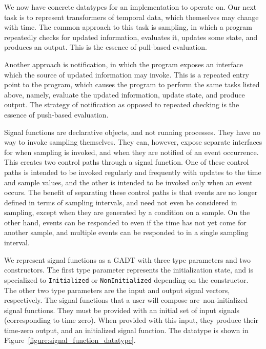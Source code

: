 \documentclass[draft]{llncs}
\begin{document}
We now have concrete datatypes for an implementation to operate on. Our next
task is to represent transformers of temporal data, which themselves may change
with time. The common approach to this task is sampling, in which a program
repeatedly checks for updated information, evaluates it, updates some state,
and produces an output. This is the essence of pull-based evaluation.

Another approach is notification, in which the program exposes an interface
which the source of updated information may invoke. This is a repeated entry
point to the program, which causes the program to perform the same tasks
listed above, namely, evaluate the updated information, update state, and
produce output. The strategy of notification as opposed to repeated checking is
the essence of push-based evaluation.

Signal functions are declarative objects, and not running processes. They have
no way to invoke sampling themselves. They can, however, expose separate
interfaces for when sampling is invoked, and when they are notified of an event
occurrence. This creates two control paths through a signal function. One of
these control paths is intended to be invoked regularly and frequently with
updates to the time and sample values, and the other is intended to be invoked
only when an event occurs. The benefit of separating these control paths is that
events are no longer defined in terms of sampling intervals, and need not even
be considered in sampling, except when they are generated by a condition on a
sample. On the other hand, events can be responded to even if the time has not
yet come for another sample, and multiple events can be responded to in a single
sampling interval.

We represent signal functions as a GADT with three type parameters and two 
constructors. The first type parameter represents the initialization state,
and is specialized to {\tt Initialized} or {\tt NonInitialized} depending on the
constructor. The other two type parameters are the input and output signal
vectors, respectively. The signal functions that a user will compose are\
non-initialized signal functions. They must be provided with an initial set of
input signals (corresponding to time zero). When provided with this input, they
produce their time-zero output, and an initialized signal function. The datatype
is shown in Figure~\ref{figure:signal_function_datatype}.
\end{document}
